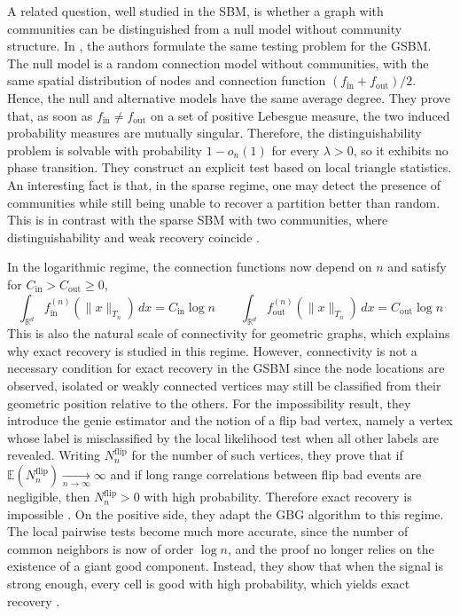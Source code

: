 \documentclass[runningheads]{llncs}
\begin{document}
A related question, well studied in the SBM, is whether a graph with communities can be distinguished from a null model without community structure. In \citep{abbe2021community}, the authors formulate the same testing problem for the GSBM. The null model is a random connection model without communities, with the same spatial distribution of nodes and connection function \((f_\mathrm{in}+f_\mathrm{out})/2\). Hence, the null and alternative models have the same average degree. They prove that, as soon as \(f_\mathrm{in}\neq f_\mathrm{out}\) on a set of positive Lebesgue measure, the two induced probability measures are mutually singular. Therefore, the distinguishability problem is solvable with probability \(1-o_n(1)\) for every \(\lambda>0\), so it exhibits no phase transition. They construct an explicit test based on local triangle statistics. An interesting fact is that, in the sparse regime, one may detect the presence of communities while still being unable to recover a partition better than random. This is in contrast with the sparse SBM with two communities, where distinguishability and weak recovery coincide \citep{mossel2012stochasticblockmodelsreconstruction}.


In the logarithmic regime, the connection functions now depend on \(n\) and satisfy for \(C_\mathrm{in}>C_\mathrm{out}\ge 0\),
\[
\int_{\mathbb R^d} f_\mathrm{in}^{(n)}(\|x\|_{T_n})\,dx = C_\mathrm{in}\log n
\qquad
\int_{\mathbb R^d} f_\mathrm{out}^{(n)}(\|x\|_{T_n})\,dx = C_\mathrm{out}\log n
\]
This is also the natural scale of connectivity for geometric graphs, which explains why exact recovery is studied in this regime. However, connectivity is not a necessary condition for exact recovery in the GSBM since the node locations are observed, isolated or weakly connected vertices may still be classified from their geometric position relative to the others.
For the impossibility result, they introduce the genie estimator and the notion of a flip bad vertex, namely a vertex whose label is misclassified by the local likelihood test when all other labels are revealed. Writing \(N_n^{\mathrm{flip}}\) for the number of such vertices, they prove that if \(\mathbb E(N_n^{\mathrm{flip}})\xrightarrow[n\to\infty]{} \infty\) and if long range correlations between flip bad events are negligible, then \(N_n^{\mathrm{flip}}>0\) with high probability. Therefore exact recovery is impossible \citep{abbe2021community}.
On the positive side, they adapt the GBG algorithm to this regime. The local pairwise tests become much more accurate, since the number of common neighbors is now of order \(\log n\), and the proof no longer relies on the existence of a giant good component. Instead, they show that when the signal is strong enough, every cell is good with high probability, which yields exact recovery \citep{abbe2021community}.
\end{document}
